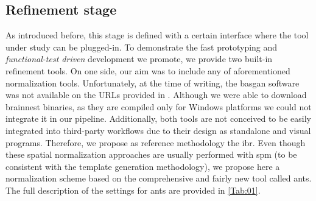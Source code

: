 \documentclass{frontiers}
\begin{document}
\subsection{Refinement stage}\label{sec:meth_refinement}
As introduced before, this stage is defined with a certain interface where the
  tool under study can be plugged-in.
To demonstrate the fast prototyping and \emph{functional-test driven} development
  we promote, we provide two built-in refinement tools.
On one side, our aim was to include any of aforementioned normalization tools.
Unfortunately, at the time of writing, the \gls*{basgan} software was not available
  on the URLs provided in \cite{calvini_basal_2007,skanjeti_assessing_2013}.
Although we were able to download \gls*{brainnest} binaries, as they are compiled 
  only for Windows platforms we could not integrate it in our pipeline.
Additionally, both tools are not conceived to be easily integrated into third-party
  workflows due to their design as standalone and visual programs.
Therefore, we propose as reference methodology the \acrfull*{ibr}.
Even though these spatial normalization approaches are usually performed with \gls*{spm}
  (to be consistent with the template generation methodology), we propose here 
  a normalization scheme based on the comprehensive and fairly new tool called \gls*{ants}.
The full description of the settings for \gls*{ants} are provided in \autoref{Tab:01}.
\end{document}
